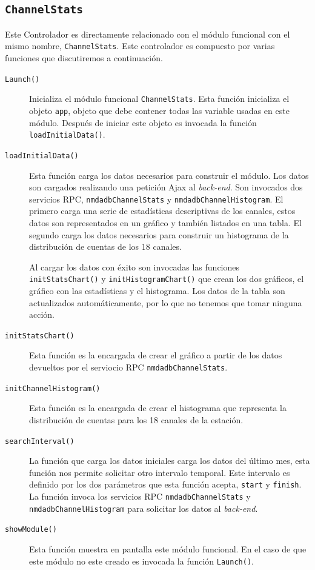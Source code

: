 	\subsection{\texttt{ChannelStats}}
		Este Controlador es directamente relacionado con el módulo funcional con el mismo nombre, \texttt{ChannelStats}. Este controlador es
		compuesto por varias funciones que discutiremos a continuación.
		\begin{description}
			\item[\texttt{Launch()}]
				Inicializa el módulo funcional \texttt{ChannelStats}. Esta función inicializa el objeto \texttt{app}, objeto que debe
				contener todas las variable usadas en este módulo. Después de iniciar este objeto es invocada la función
				\texttt{loadInitialData()}.
			\item[\texttt{loadInitialData()}]
				Esta función carga los datos necesarios para construir el módulo. Los datos son cargados realizando una petición Ajax
				al \emph{back-end}. Son invocados dos servicios RPC, \texttt{nmdadbChannelStats} y \texttt{nmdadbChannelHistogram}. El
				primero carga una serie de estadísticas descriptivas de los canales, estos datos son representados en un gráfico y
				también listados en una tabla. El segundo carga los datos necesarios para construir un histograma de la distribución
				de cuentas de los 18 canales.
				\par
				Al cargar los datos con éxito son invocadas las funciones \texttt{initStatsChart()} y \texttt{initHistogramChart()}
				que  crean los dos gráficos, el gráfico con las estadísticas y el histograma. Los datos de la tabla son actualizados
				automáticamente, por lo que no tenemos que tomar ninguna acción.
			\item[\texttt{initStatsChart()}]
				Esta función es la encargada de crear el gráfico a partir de los datos devueltos por el serviocio RPC
				\texttt{nmdadbChannelStats}. 
			\item[\texttt{initChannelHistogram()}]
				Esta función es la encargada de crear el histograma que representa la distribución de cuentas para los 18 canales de
				la estación.
			\item[\texttt{searchInterval()}]
				La función que carga los datos iniciales carga los datos del último mes, esta función nos permite solicitar otro
				intervalo temporal. Este intervalo es definido por los dos parámetros que esta función acepta, \texttt{start} y
				\texttt{finish}. La función invoca los servicios RPC \texttt{nmdadbChannelStats} y \texttt{nmdadbChannelHistogram}
				para solicitar los datos al \emph{back-end}.
			\item[\texttt{showModule()}]
				Esta función muestra en pantalla este módulo funcional. En el caso de que este módulo no este creado es invocada la
				función \texttt{Launch()}.
		\end{description}


